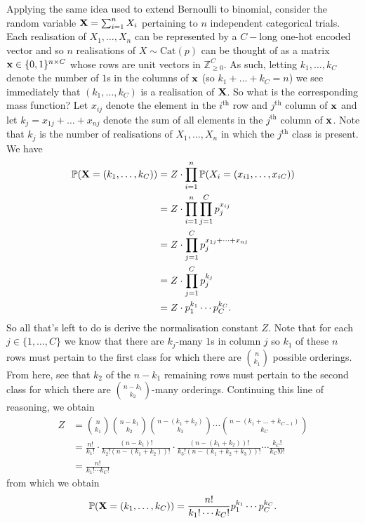\documentclass[11pt]{article}
\begin{document}
\begin{appendices}
Applying the same idea used to extend Bernoulli to binomial, consider the random variable $\mathbf{X}=\sum_{i=1}^nX_i$ pertaining to $n$ independent categorical trials. Each realisation of $X_1,\dots,X_n$ can be represented by a $C-$long one-hot encoded vector and so $n$ realisations of $X\sim\text{Cat}(p)$ can be thought of as a matrix $\mathbf{x}\in\{0,1\}^{n\times C}$ whose rows are unit vectors in $\mathbb{Z}_{\geq0}^C$. As such, letting $k_1,\dots,k_C$ denote the number of $1$s in the columns of $\mathbf{x}$ (so $k_1+\dots+k_C=n$) we see immediately that $(k_1,\dots,k_C)$ is a realisation of $\mathbf{X}$. So what is the corresponding mass function? Let $x_{ij}$ denote the element in the $i^{\text{th}}$ row and $j^{\text{th}}$ column of $\mathbf{x}$ and let $k_j=x_{1j}+\dots+x_{nj}$ denote the sum of all elements in the $j^{\text{th}}$ column of $\mathbf{x}$. Note that $k_j$ is the number of realisations of $X_1,\dots,X_n$ in which the $j^{\text{th}}$ class is present. We have
\begin{align*}
    \mathbb{P}(\mathbf{X}=(k_1,\dots,k_C))
    &=
    Z\cdot\prod_{i=1}^n\mathbb{P}(X_i=(x_{i1},\dots,x_{iC}))\\
    &=
    Z\cdot\prod_{i=1}^n\prod_{j=1}^Cp_j^{x_{ij}}\\
    &=
    Z\cdot\prod_{j=1}^Cp_j^{x_{1j}+\dots+x_{nj}}\\
    &=
    Z\cdot\prod_{j=1}^Cp_j^{k_j}\\
    &=
    Z\cdot p_1^{k_1}\cdots p_C^{k_C}.
\end{align*}
So all that's left to do is derive the normalisation constant $Z$. Note that for each $j\in\{1,\dots,C\}$ we know that there are $k_j$-many $1$s in column $j$ so $k_1$ of these $n$ rows must pertain to the first class for which there are $\binom{n}{k_1}$ possible orderings. From here, see that $k_2$ of the $n-k_1$ remaining rows must pertain to the second class for which there are $\binom{n-k_1}{k_2}$-many orderings. Continuing this line of reasoning, we obtain
\begin{align*}
    Z
    &=
    \binom{n}{k_1}\binom{n-k_1}{k_2}\binom{n-(k_1+k_2)}{k_3}\cdots\binom{n-(k_1+\dots+k_{C-1})}{k_C}\\
    &=
    \frac{n!}{k_1!}\cdot\frac{(n-k_1)!}{k_2!(n-(k_1+k_2))!}\cdot\frac{(n-(k_1+k_2))!}{k_3!(n-(k_1+k_2+k_3))!}\cdots\frac{k_C!}{k_C!0!}\\
    &=
    \frac{n!}{k_1!\cdots k_C!}
\end{align*}
from which we obtain
$$
\mathbb{P}(\mathbf{X}=(k_1,\dots,k_C))
=
\frac{n!}{k_1!\cdots k_C!}p_1^{k_1}\cdots p_C^{k_C}.
$$


\end{appendices}
\end{document}
